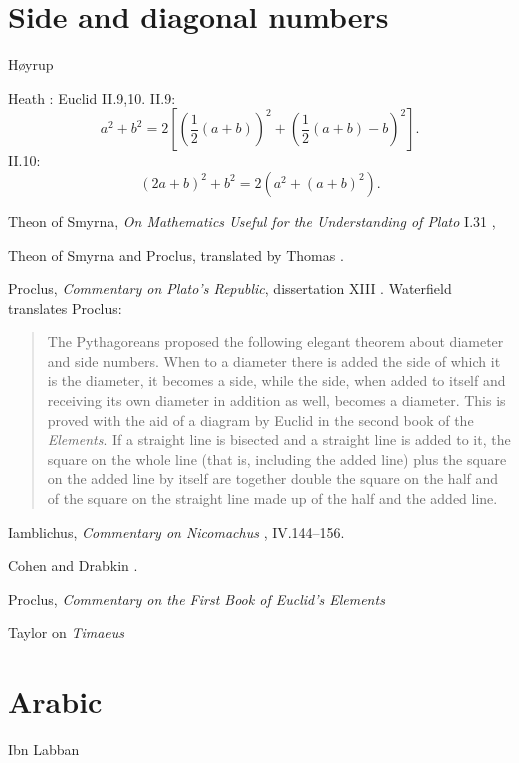\documentclass{amsart}
\theoremstyle{definition}
\begin{document}
\section{Side and diagonal numbers}
H{\o}yrup \cite[p.~261]{hoyrup}

Heath \cite[pp.~392--402]{euclidI}: Euclid II.9,10. II.9:
\[
a^2+b^2=2\left[ \left(  \frac{1}{2}(a+b) \right)^2
+\left(\frac{1}{2}(a+b)-b\right)^2 \right].
\]
II.10:
\[
(2a+b)^2 + b^2 = 2(a^2+(a+b)^2).
\]

Theon of Smyrna, {\em On Mathematics Useful for the Understanding of Plato} I.31  \cite[pp.~70--75]{dupuis}, 

Theon of Smyrna and Proclus, translated by Thomas \cite[pp.~132--139]{thomasI}.

Proclus, {\em Commentary on Plato's {\em Republic}}, dissertation XIII \cite[pp.~133--135]{festugiereII}.
Waterfield \cite[pp.~107--108]{waterfield} translates Proclus:

\begin{quote}
The Pythagoreans proposed the following elegant theorem
about diameter and side numbers. When to a diameter there is added
the side of which it is the diameter, it becomes a side, while the side,
when added to itself and receiving its own diameter in addition as
well, becomes a diameter. This is proved with the aid of a diagram by
Euclid in the second book of the {\em Elements}. If a straight line is
bisected and a straight line is added to it, the square on the whole
line (that is, including the added line) plus the square on the added
line by itself are together double the square on the half and of the
square on the straight line made up of the half and the added
line.
\end{quote}

Iamblichus, {\em Commentary on Nicomachus} \cite{iamblichus}, IV.144--156.

Cohen and Drabkin \cite[pp.~42--43]{drabkin}.


Proclus, {\em Commentary on the First Book of Euclid's Elements}  \cite{proclus}

Taylor on {\em Timaeus} \cite{taylortimaeus}




\section{Arabic}
Ibn Labban \cite{wisconsin8}
\end{document}
